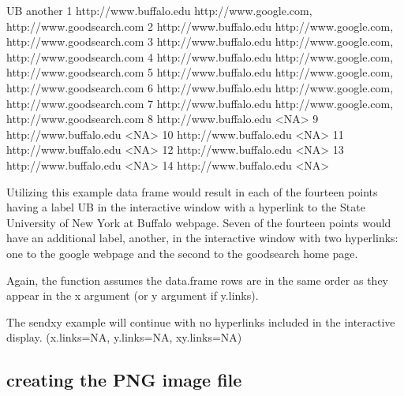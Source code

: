 \documentclass[]{article}
\begin{document}
\begin{Schunk}
\begin{Soutput}
                       UB                                          another
1  http://www.buffalo.edu http://www.google.com, http://www.goodsearch.com
2  http://www.buffalo.edu http://www.google.com, http://www.goodsearch.com
3  http://www.buffalo.edu http://www.google.com, http://www.goodsearch.com
4  http://www.buffalo.edu http://www.google.com, http://www.goodsearch.com
5  http://www.buffalo.edu http://www.google.com, http://www.goodsearch.com
6  http://www.buffalo.edu http://www.google.com, http://www.goodsearch.com
7  http://www.buffalo.edu http://www.google.com, http://www.goodsearch.com
8  http://www.buffalo.edu                                             <NA>
9  http://www.buffalo.edu                                             <NA>
10 http://www.buffalo.edu                                             <NA>
11 http://www.buffalo.edu                                             <NA>
12 http://www.buffalo.edu                                             <NA>
13 http://www.buffalo.edu                                             <NA>
14 http://www.buffalo.edu                                             <NA>
\end{Soutput}
\end{Schunk}

\indent Utilizing this example data frame would result in each of the fourteen points having a label UB in the interactive window with a hyperlink to the State University of New York at Buffalo webpage. Seven of the fourteen points would have an additional label, another, in the interactive window with two hyperlinks: one to the google webpage and the second to the goodsearch home page. \newline

 Again, the function assumes the data.frame rows are in the same order as they appear in the x argument (or y argument if y.links).  \newline

\indent The sendxy example will continue with no hyperlinks included in the interactive display. (x.links=NA, y.links=NA, xy.links=NA)



\subsection{creating the PNG image file}
\end{document}

